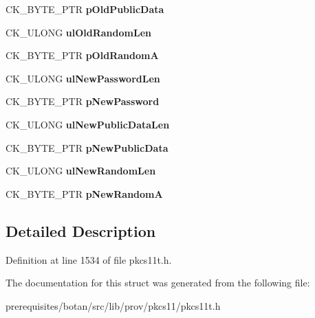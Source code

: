 \begin{DoxyCompactItemize}
C\+K\+\_\+\+B\+Y\+T\+E\+\_\+\+P\+TR {\bfseries p\+Old\+Public\+Data}
\item 
\mbox{\label{struct_c_k___s_k_i_p_j_a_c_k___r_e_l_a_y_x___p_a_r_a_m_s_a6d0c55f85987d89152ae85ec76794377}} 
C\+K\+\_\+\+U\+L\+O\+NG {\bfseries ul\+Old\+Random\+Len}
\item 
\mbox{\label{struct_c_k___s_k_i_p_j_a_c_k___r_e_l_a_y_x___p_a_r_a_m_s_a615eeb160a23cc5663e33f56dc4df40d}} 
C\+K\+\_\+\+B\+Y\+T\+E\+\_\+\+P\+TR {\bfseries p\+Old\+RandomA}
\item 
\mbox{\label{struct_c_k___s_k_i_p_j_a_c_k___r_e_l_a_y_x___p_a_r_a_m_s_adf3080690b07550b8f1b4883edbb2ab6}} 
C\+K\+\_\+\+U\+L\+O\+NG {\bfseries ul\+New\+Password\+Len}
\item 
\mbox{\label{struct_c_k___s_k_i_p_j_a_c_k___r_e_l_a_y_x___p_a_r_a_m_s_a7ebb58594ac729d26b00c4dc7f3a17c6}} 
C\+K\+\_\+\+B\+Y\+T\+E\+\_\+\+P\+TR {\bfseries p\+New\+Password}
\item 
\mbox{\label{struct_c_k___s_k_i_p_j_a_c_k___r_e_l_a_y_x___p_a_r_a_m_s_ae8cf50e7d1ad0f0320761f4657a649ba}} 
C\+K\+\_\+\+U\+L\+O\+NG {\bfseries ul\+New\+Public\+Data\+Len}
\item 
\mbox{\label{struct_c_k___s_k_i_p_j_a_c_k___r_e_l_a_y_x___p_a_r_a_m_s_aa9b447dbf217bfb55fe13f3d0bbc5a45}} 
C\+K\+\_\+\+B\+Y\+T\+E\+\_\+\+P\+TR {\bfseries p\+New\+Public\+Data}
\item 
\mbox{\label{struct_c_k___s_k_i_p_j_a_c_k___r_e_l_a_y_x___p_a_r_a_m_s_a4e7516cf5b540f26f34e456456177a96}} 
C\+K\+\_\+\+U\+L\+O\+NG {\bfseries ul\+New\+Random\+Len}
\item 
\mbox{\label{struct_c_k___s_k_i_p_j_a_c_k___r_e_l_a_y_x___p_a_r_a_m_s_acd5cfdff0433d3c431f883ffdb8d941b}} 
C\+K\+\_\+\+B\+Y\+T\+E\+\_\+\+P\+TR {\bfseries p\+New\+RandomA}
\end{DoxyCompactItemize}


\subsection{Detailed Description}


Definition at line 1534 of file pkcs11t.\+h.



The documentation for this struct was generated from the following file\+:\begin{DoxyCompactItemize}
\item 
prerequisites/botan/src/lib/prov/pkcs11/pkcs11t.\+h\end{DoxyCompactItemize}
